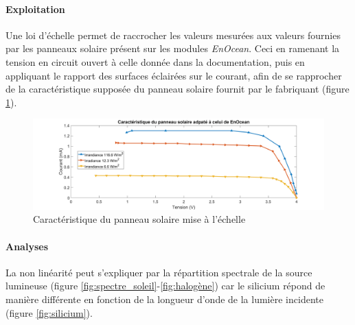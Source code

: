 \documentclass{rapportENS}
\begin{document}
 
 \paragraph{Exploitation} Une loi d'échelle permet de raccrocher les valeurs mesurées aux valeurs fournies par les panneaux solaire présent sur les modules \textit{EnOcean}. Ceci en ramenant la tension en circuit ouvert à celle donnée dans la documentation, puis en appliquant le rapport des surfaces éclairées sur le courant, afin de se rapprocher de la caractéristique supposée du panneau solaire fournit par le fabriquant (figure \ref{fig:plot_enocean}).
 
 \begin{figure}[h!]
     \centering
     \includegraphics[width=\linewidth]{plot_enocean.png}
    \vspace{0.3cm}
     \caption{Caractéristique du panneau solaire mise à l'échelle}
    \vspace{0.5cm}
     \label{fig:plot_enocean}
 \end{figure}
 
 \paragraph{Analyses} La non linéarité  peut s'expliquer par la répartition spectrale de la source lumineuse (figure  \ref{fig:spectre_soleil}-\ref{fig:halogène}) car le silicium répond de manière différente en fonction de la longueur d'onde de la lumière incidente (figure \ref{fig:silicium}).
 
\end{document}
